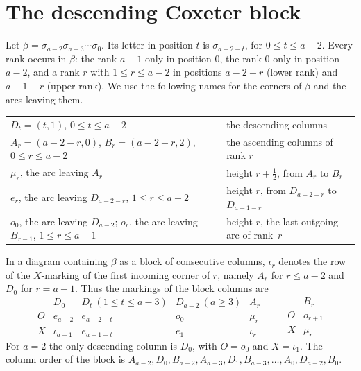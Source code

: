 \documentclass[11pt]{amsart}
\theoremstyle{definition}
\theoremstyle{remark}
\begin{document}
\section{The descending Coxeter block}\label{sec:block}

Let $\beta=\sigma_{a-2}\sigma_{a-3}\cdots\sigma_0$. Its letter in position $t$ is $\sigma_{a-2-t}$,
for $0\le t\le a-2$. Every rank occurs in $\beta$: the rank $a-1$ only in position $0$, the rank $0$
only in position $a-2$, and a rank $r$ with $1\le r\le a-2$ in positions $a-2-r$ (lower rank) and
$a-1-r$ (upper rank). We use the following names for the corners of $\beta$ and the arcs leaving
them.
\begin{center}
\begin{tabular}{@{}p{}p{}@{}}
\toprule
$D_t=(t,1)$, $0\le t\le a-2$ & the descending columns\\
$A_r=(a-2-r,0)$, $B_r=(a-2-r,2)$, $0\le r\le a-2$ & the ascending columns of rank $r$\\
$\mu_r$, the arc leaving $A_r$ & height $r+\frac12$, from $A_r$ to $B_r$\\
$e_r$, the arc leaving $D_{a-2-r}$, $1\le r\le a-2$ & height $r$, from $D_{a-2-r}$ to $D_{a-1-r}$\\
$o_0$, the arc leaving $D_{a-2}$; $o_r$, the arc leaving $B_{r-1}$, \mbox{$1\le r\le a-1$} & height $r$,
the last outgoing arc of rank~$r$\\
\bottomrule
\end{tabular}
\end{center}
In a diagram containing $\beta$ as a block of consecutive columns, $\iota_r$ denotes the row of the
$X$-marking of the first incoming corner of $r$, namely $A_r$ for $r\le a-2$ and $D_0$ for $r=a-1$.
Thus the markings of the block columns are
\[
\begin{array}{c|cccc}
 & D_0 & D_t\ (1\le t\le a-3) & D_{a-2}\ (a\ge3) & A_r\\ \hline
 O & e_{a-2} & e_{a-2-t} & o_0 & \mu_r\\
 X & \iota_{a-1} & e_{a-1-t} & e_1 & \iota_r
\end{array}
\qquad
\begin{array}{c|c}
 & B_r\\ \hline
 O & o_{r+1}\\
 X & \mu_r
\end{array}
\]
For $a=2$ the only descending column is $D_0$, with $O=o_0$ and $X=\iota_1$. The column order of the
block is $A_{a-2},D_0,B_{a-2},A_{a-3},D_1,B_{a-3},\dots,A_0,D_{a-2},B_0$.
\end{document}
